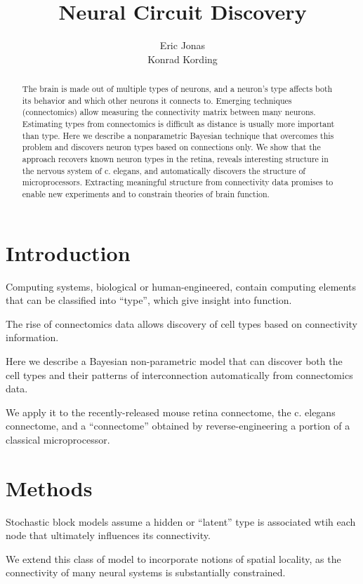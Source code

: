 \documentclass{article}
\title{Neural Circuit Discovery}
\author{Eric Jonas \\ Konrad Kording}
\begin{document}
\maketitle

\listoftodos

\begin{abstract}
  The brain is made out of multiple types of neurons, and a neuron’s
  type affects both its behavior and which other neurons it connects
  to. Emerging techniques (connectomics) allow measuring the
  connectivity matrix between many neurons. Estimating types from
  connectomics is difficult as distance is usually more important than
  type. Here we describe a nonparametric Bayesian technique that
  overcomes this problem and discovers neuron types based on
  connections only. We show that the approach recovers known neuron
  types in the retina, reveals interesting structure in the nervous
  system of c. elegans, and automatically discovers the structure of
  microprocessors. Extracting meaningful structure from connectivity
  data promises to enable new experiments and to constrain theories of
  brain function.

\end{abstract}

\section{Introduction}
Computing systems, biological or human-engineered, contain computing
elements that can be classified into ``type'', which give
insight into function. 

The rise of connectomics data allows discovery of cell types
based on connectivity information. 

Here we describe a Bayesian non-parametric model that can discover
both the cell types and their patterns of interconnection automatically
from connectomics data. 

We apply it to the recently-released mouse retina connectome, the
c. elegans connectome, and a ``connectome'' obtained by
reverse-engineering a portion of a classical microprocessor.


\section{Methods}
Stochastic block models assume a hidden or ``latent'' type is associated
wtih each node that ultimately influences its connectivity. 

We extend this class of model to incorporate notions of spatial locality, 
as the connectivity of many neural systems is substantially constrained. 
\end{document}
